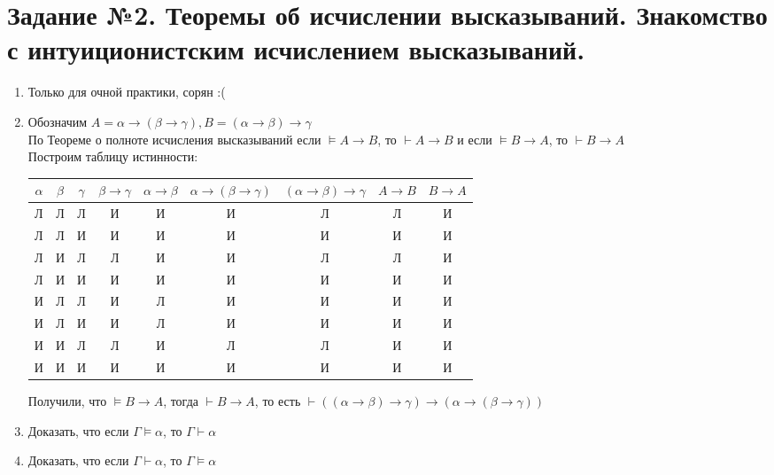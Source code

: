 \documentclass[12pt,a4paper,oneside]{article}
\begin{document}
\section*{Задание №2. Теоремы об исчислении высказываний. Знакомство с интуиционистским исчислением высказываний.}
\begin{enumerate}

\item Только для очной практики, сорян :(
\item Обозначим $A = \alpha \rightarrow (\beta \rightarrow  \gamma), 
B = (\alpha \rightarrow \beta) \rightarrow  \gamma$ \\
По Теореме о полноте исчисления высказываний если $ \models A \rightarrow B $, то 
$ \vdash A \rightarrow B $ и если $ \models B \rightarrow A $, то 
$ \vdash B \rightarrow A $ \\
Построим таблицу истинности:\\
\begin{center}
\begin{tabular}{ c c c | c c c c c c }
 $ \alpha $ & $ \beta $ & $ \gamma $ & $ \beta \rightarrow  \gamma $ & $ \alpha \rightarrow \beta $ & $ \alpha \rightarrow (\beta \rightarrow  \gamma) $ & $ (\alpha \rightarrow \beta) \rightarrow  \gamma $ & $ A \rightarrow B$ & $ B \rightarrow A $ \\ 
 \hline
 Л & Л & Л & И & И & И & Л & Л & И\\
Л & Л & И & И & И & И & И & И & И\\
Л & И & Л & Л & И & И & Л & Л & И\\
Л & И & И & И & И & И & И & И & И\\
И & Л & Л & И & Л & И & И & И & И\\
И & Л & И & И & Л & И & И & И & И\\
И & И & Л & Л & И & Л & Л & И & И\\
И & И & И & И & И & И & И & И & И
\end{tabular}
\end{center}

Получили, что $ \models B \rightarrow A $, тогда $ \vdash B \rightarrow A $, то есть 
$ \vdash ((\alpha \rightarrow \beta) \rightarrow  \gamma) \rightarrow (\alpha \rightarrow (\beta \rightarrow  \gamma))$

\item Доказать, что если $ \Gamma \models \alpha $, то $ \Gamma \vdash \alpha $
\item Доказать, что если $ \Gamma \vdash \alpha $, то $ \Gamma  \models \alpha $

\end{enumerate}
\end{document}
